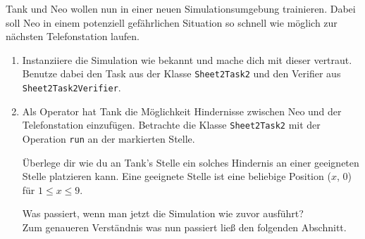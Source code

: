 

Tank und Neo wollen nun in einer neuen Simulationsumgebung trainieren. 
Dabei soll Neo in einem potenziell gefährlichen Situation so schnell wie möglich zur nächsten Telefonstation laufen.

\begin{enumerate}
    \item Instanziiere die Simulation wie bekannt und mache dich mit dieser vertraut. 
        Benutze dabei den Task aus der Klasse \lstinline{Sheet2Task2} und den Verifier aus \lstinline{Sheet2Task2Verifier}.
    \item Als Operator hat Tank die Möglichkeit Hindernisse zwischen Neo und der Telefonstation einzufügen.
        Betrachte die Klasse \lstinline{Sheet2Task2} mit der Operation \lstinline{run} an der markierten Stelle.

        Überlege dir wie du an Tank's Stelle ein solches Hindernis an einer geeigneten Stelle platzieren kann.
        Eine geeignete Stelle ist eine beliebige Position ($x$, 0) für $1 \leq x \leq 9$.

        Was passiert, wenn man jetzt die Simulation wie zuvor ausführt?\\
        Zum genaueren Verständnis was nun passiert ließ den folgenden Abschnitt.
\end{enumerate}



